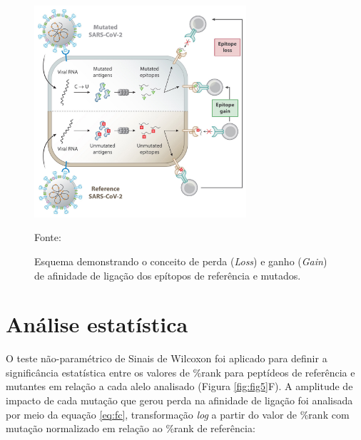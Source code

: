 \begin{justify}
\begin{figure}
    \centering
    \caption{\justifying Esquema demonstrando o conceito de perda (\textit{Loss}) e ganho (\textit{Gain}) de afinidade de ligação dos epítopos de referência e mutados. }
    \includegraphics[width=0.7\textwidth]{Figuras/fig6.jpg}
    \label{fig:fig6}
    \begin{minipage}{0.8\textwidth} %
        \centering
        \footnotesize Fonte: 
    \end{minipage}
\end{figure}

\begin{figure}
\end{figure}

\section{Análise estatística}

O teste não-paramétrico de Sinais de Wilcoxon foi aplicado para definir a significância estatística entre os valores de \%rank para peptídeos de referência e mutantes em relação a cada alelo analisado (Figura \ref{fig:fig5}F). A amplitude de impacto de cada mutação que gerou perda na afinidade de ligação foi analisada por meio da equação \eqref{eq:fc}, transformação \textit{log} a partir do valor de \%rank com mutação normalizado em relação ao \%rank de referência:
%

\begin{subequations}
\begin{gather}


\end{gather}
\end{subequations}
\end{justify}
